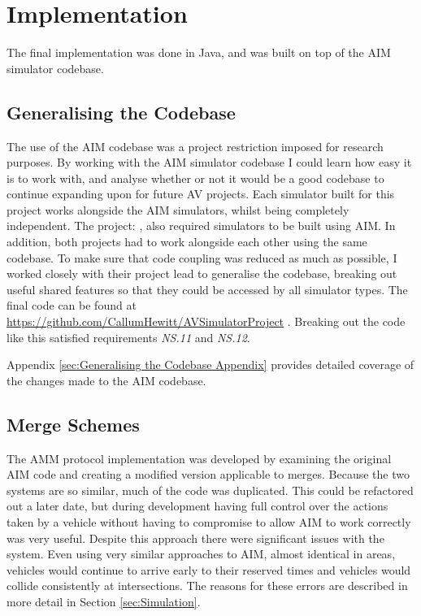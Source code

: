 \chapter{Implementation}
\label{cha:Implementation}
The final implementation was done in Java, and was built on top of the AIM simulator codebase.

\section{Generalising the Codebase}
\label{sec:Generalising the Codebase}
The use of the AIM codebase was a project restriction imposed for research purposes. By working with the AIM simulator codebase I could learn how easy it is to work with, and analyse whether or not it would be a good codebase to continue expanding upon for future AV projects. Each simulator built for this project works alongside the AIM simulators, whilst being completely independent. The project:  \citep{Milligan2017}, also required simulators to be built using AIM. In addition, both projects had to work alongside each other using the same codebase. To make sure that code coupling was reduced as much as possible, I worked closely with their project lead to generalise the codebase, breaking out useful shared features so that they could be accessed by all simulator types. The final code can be found at \url{https://github.com/CallumHewitt/AVSimulatorProject} \citep{Codebase}. Breaking out the code like this satisfied requirements \emph{NS.11} and \emph{NS.12}.

Appendix \ref{sec:Generalising the Codebase Appendix} provides detailed coverage of the changes made to the AIM codebase.
\section{Merge Schemes}
\label{sec:Merge Schemes}
The AMM protocol implementation was developed by examining the original AIM code and creating a modified version applicable to merges. Because the two systems are so similar, much of the code was duplicated. This could be refactored out a later date, but during development having full control over the actions taken by a vehicle without having to compromise to allow AIM to work correctly was very useful. Despite this approach there were significant issues with the system. Even using very similar approaches to AIM, almost identical in areas, vehicles would continue to arrive early to their reserved times and vehicles would collide consistently at intersections. The reasons for these errors are described in more detail in Section \ref{sec:Simulation}.

